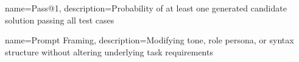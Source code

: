 {
    name={Pass@1},
    description={Probability of at least one generated candidate solution passing all test cases}
}

{
    name={Prompt Framing},
    description={Modifying tone, role persona, or syntax structure without altering underlying task requirements}
}
